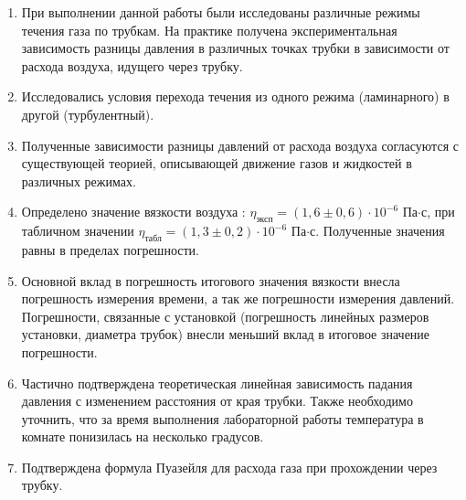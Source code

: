 \documentclass[12pt,a4paper]{article}
\begin{document}
\begin{enumerate}
	\item При выполнении данной работы были исследованы различные режимы течения газа по трубкам. На практике получена экспериментальная зависимость разницы давления в различных точках трубки в зависимости от расхода воздуха, идущего через трубку.
	\item Исследовались условия перехода течения из одного режима (ламинарного) в другой (турбулентный).
	\item Полученные зависимости разницы давлений от расхода воздуха согласуются с существующей теорией, описывающей движение газов и жидкостей в различных режимах.
	\item Определено значение вязкости воздуха : $\eta_{\text{эксп}} = \left(1,6 \pm 0,6\right) \cdot 10^{-6}$ Па$\cdot$с, при табличном значении $\eta_{\text{табл}} = \left(1,3 \pm 0,2\right) \cdot 10^{-6}$ Па$\cdot$с. Полученные значения равны в пределах погрешности.
	\item Основной вклад в погрешность итогового значения вязкости внесла погрешность измерения времени, а так же погрешности измерения давлений. Погрешности, связанные с установкой (погрешность линейных размеров установки, диаметра трубок) внесли меньший вклад в итоговое значение погрешности.
	\item Частично подтверждена теоретическая линейная зависимость падания давления с изменением расстояния от края трубки. Также необходимо уточнить, что за время выполнения лабораторной работы температура в комнате понизилась на несколько градусов. 
	\item Подтверждена формула Пуазейля для расхода газа при прохождении через трубку.
\end{enumerate}
\end{document}
